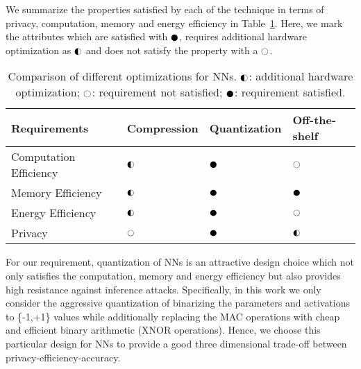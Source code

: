 We summarize the properties satisfied by each of the technique in terms of privacy, computation, memory and energy efficiency in Table~\ref{tbl:comparison}.
Here, we mark the attributes which are satisfied with $\cmark$, requires additional hardware optimization as $\smark$ and does not satisfy the property with a $\xmark$.

\begin{table}[!htb]
\begin{center}
\renewcommand\arraystretch{1.5}
\fontsize{6.7pt}{6.7pt}\selectfont
\begin{tabular}{|l||l|l|l|}
\hline
Requirements & Compression & Quantization & Off-the-shelf  \\
\hline
Computation Efficiency & $\smark$  & $\cmark$   & $\xmark$ \\
\hline
Memory Efficiency &  $\smark$ & $\cmark$   & $\cmark$ \\
\hline
Energy Efficiency &  $\smark$   & $\cmark$   & $\xmark$ \\
\hline
Privacy &  $\xmark$   & $\cmark$   & $\smark$ \\
\hline
\end{tabular}
\end{center}
\caption{Comparison of different optimizations for NNs. $\smark$: additional hardware optimization; $\xmark$: requirement not satisfied; $\cmark$: requirement satisfied.}
\label{tbl:comparison}
\end{table}

For our requirement, quantization of NNs is an attractive design choice which not only satisfies the computation, memory and energy efficiency but also provides high resistance against inference attacks.
Specifically, in this work we only consider the aggressive quantization of binarizing the parameters and activations to \{-1,+1\} values while additionally replacing the MAC operations with cheap and efficient binary arithmetic (XNOR operations).
Hence, we choose this particular design for NNs to provide a good three dimensional trade-off between privacy-efficiency-accuracy.
